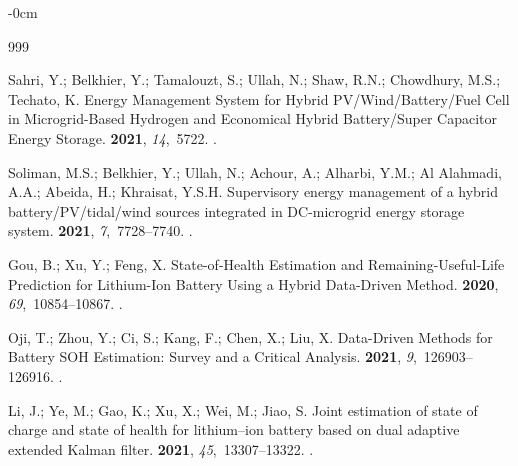 \documentclass[energies,article,accept,pdftex,moreauthors]{Definitions/mdpi}
\begin{document}
\begin{adjustwidth}{-\extralength}{0cm}




\begin{thebibliography}{999}

Sahri, Y.; Belkhier, Y.; Tamalouzt, S.; Ullah, N.; Shaw, R.N.; Chowdhury, M.S.;
  Techato, K.
\newblock Energy Management System for Hybrid PV/Wind/Battery/Fuel Cell in
  Microgrid-Based Hydrogen and Economical Hybrid Battery/Super Capacitor Energy
  Storage.
 {\bf 2021}, {\em 14},~5722.
.

Soliman, M.S.; Belkhier, Y.; Ullah, N.; Achour, A.; Alharbi, Y.M.; {Al
  Alahmadi}, A.A.; Abeida, H.; Khraisat, Y.S.H.
\newblock Supervisory energy management of a hybrid battery/PV/tidal/wind
  sources integrated in DC-microgrid energy storage system.
 {\bf 2021}, {\em 7},~7728--7740.
.

Gou, B.; Xu, Y.; Feng, X.
\newblock State-of-Health Estimation and Remaining-Useful-Life Prediction for
  Lithium-Ion Battery Using a Hybrid Data-Driven Method.
 {\bf 2020}, {\em
  69},~10854--10867.
.

Oji, T.; Zhou, Y.; Ci, S.; Kang, F.; Chen, X.; Liu, X.
\newblock Data-Driven Methods for Battery SOH Estimation: Survey and a Critical
  Analysis.
 {\bf 2021}, {\em 9},~126903--126916.
.

Li, J.; Ye, M.; Gao, K.; Xu, X.; Wei, M.; Jiao, S.
\newblock Joint estimation of state of charge and state of health for
  lithium--ion battery based on dual adaptive extended Kalman filter.
 {\bf 2021}, {\em
  45},~13307--13322.
.


\end{thebibliography}
\end{adjustwidth}
\end{document}
